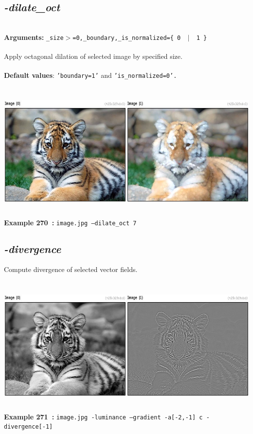 \documentclass[a4paper,11pt,twoside]{book}
\begin{document}
\subsection{\emph{-dilate\_oct} }\vspace*{-0.5em}
~\\\textbf{Arguments: } 
{\small \texttt{\_size$>$=0,\_boundary,\_is\_normalized=\{ 0 ~$|$~ 1 \}}}\\~\\
Apply octagonal dilation of selected image by specified size.
~\\~\\\textbf{Default values}: {\small \texttt{'boundary=1'} and \texttt{'is\_normalized=0'.}}
\begin{center}\includegraphics[keepaspectratio=true,height=7cm,width=\textwidth]{img/gmic_def270.jpg}\\
{\footnotesize \textbf{Example 270~:} \texttt{image.jpg --dilate\_oct 7}}
\end{center}

\subsection{\emph{-divergence} }\vspace*{-0.5em}
Compute divergence of selected vector fields.
\begin{center}\includegraphics[keepaspectratio=true,height=7cm,width=\textwidth]{img/gmic_def271.jpg}\\
{\footnotesize \textbf{Example 271~:} \texttt{image.jpg -luminance --gradient -a[-2,-1] c -divergence[-1]}}
\end{center}
\end{document}
